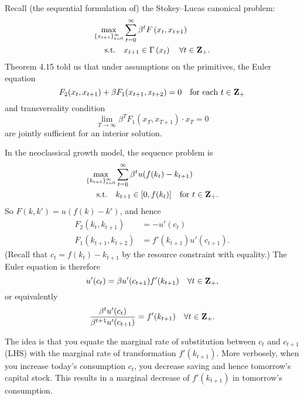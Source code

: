 \documentclass[11pt,letterpaper,reqno,oneside]{article}
\begin{document}
Recall (the sequential formulation of) the Stokey--Lucas canonical problem:
%
\begin{align*}
	\max_{\{x_{t+1}\}_{t=0}^\infty} 
	& \sum_{t=0}^\infty \beta^t F \left( x_t,x_{t+1} \right) 
	\\
	\text{s.t.}\quad
	& x_{t+1} \in \Gamma \left( x_t \right) \quad\forall t \in \mathbf{Z}_+ .
\end{align*}
%
Theorem 4.15 told us that under assumptions on the primitives, the Euler equation
%
\begin{equation*}
	F_2(x_t,x_{t+1}) + \beta F_1(x_{t+1},x_{t+2}) = 0
	\quad\text{for each $t \in \mathbf{Z}_+$} 
\end{equation*}
%
and transversality condition
%
\begin{equation*}
	\lim_{T \to \infty} \beta^T F_1(x_T,x_{T+1}) \cdot x_T = 0 
\end{equation*}
%
are jointly sufficient for an interior solution.

In the neoclassical growth model, the sequence problem is
%
\begin{align*}
	\max_{ \{k_{t+1}\}_{t=0}^\infty } 
	& \sum_{t=0}^\infty \beta^t u( f(k_t) - k_{t+1} ) 
	\\
	\text{s.t.}\quad
	& k_{t+1} \in [0,f(k_t)] \quad\text{for $t \in \mathbf{Z}_+$} .
\end{align*}
%
So $F \left( k, k' \right) = u \left( f(k) - k' \right)$, and hence
%
\begin{align*}
	F_2 \left( k_t, k_{t+1} \right) 
	&= - u' \left( c_t \right)
	\\
	F_1 \left( k_{t+1}, k_{t+2} \right) 
	&= f'(k_{t+1}) u' \left( c_{t+1} \right) .
\end{align*}
%
(Recall that $c_t = f(k_t) - k_{t+1}$ by the resource constraint with equality.) The Euler equation is therefore
%
\begin{equation*}
	u'(c_t) = \beta u'(c_{t+1}) f'(k_{t+1})
	\quad\forall t \in \mathbf{Z}_+ ,
\end{equation*}
%
or equivalently
%
\begin{equation*}
	\frac{ \beta^t u'(c_t) }{ \beta^{t+1} u'(c_{t+1}) } =  f'(k_{t+1})
	\quad\forall t \in \mathbf{Z}_+ .
\end{equation*}

The idea is that you equate the marginal rate of substitution between $c_t$ and $c_{t+1}$ (LHS) with the marginal rate of transformation $f'(k_{t+1})$. More verbosely, when you increase today's consumption $c_t$, you decrease saving and hence tomorrow's capital stock. This results in a marginal decrease of $f'(k_{t+1})$ in tomorrow's consumption.
\end{document}
